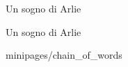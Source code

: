 \documentclass[xcolor=x11names,compress]{beamer}
\begin{document}
{
\begin{frame}[t]{Un sogno di Arlie}
    \vspace{-0.2cm}
    
\end{frame}}

{
\begin{frame}[t]{Un sogno di Arlie}
    \vspace{-0.2cm}
    
    
     {minipages/chain_of_words}
\end{frame}}
\end{document}
